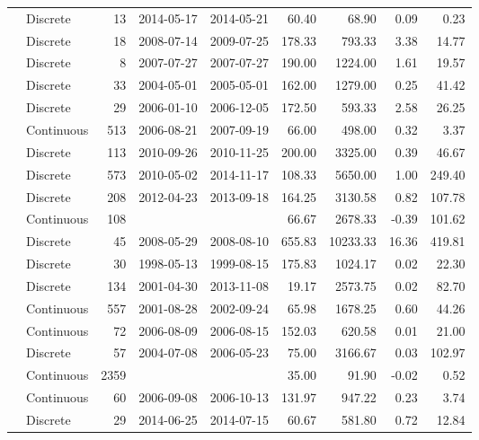 \begin{table}[ht]
\begin{tabular}{llrllrrrr}
  \citet{Gonnelli2016} & Discrete &  13 & 2014-05-17 & 2014-05-21 & 60.40 & 68.90 & 0.09 & 0.23 \\ 
  \citet{Griffin2011} & Discrete &  18 & 2008-07-14 & 2009-07-25 & 178.33 & 793.33 & 3.38 & 14.77 \\ 
  \citet{Gueguen2011} & Discrete &   8 & 2007-07-27 & 2007-07-27 & 190.00 & 1224.00 & 1.61 & 19.57 \\ 
  \citet{Helms2008} & Discrete &  33 & 2004-05-01 & 2005-05-01 & 162.00 & 1279.00 & 0.25 & 41.42 \\ 
  \citet{Hernes2008} & Discrete &  29 & 2006-01-10 & 2006-12-05 & 172.50 & 593.33 & 2.58 & 26.25 \\ 
  \citet{kattegat} & Continuous & 513 & 2006-08-21 & 2007-09-19 & 66.00 & 498.00 & 0.32 & 3.37 \\ 
  \citet{Kellerman2015} & Discrete & 113 & 2010-09-26 & 2010-11-25 & 200.00 & 3325.00 & 0.39 & 46.67 \\ 
  \citet{Lambert2015a} & Discrete & 573 & 2010-05-02 & 2014-11-17 & 108.33 & 5650.00 & 1.00 & 249.40 \\ 
  \citet{Loken2016} & Discrete & 208 & 2012-04-23 & 2013-09-18 & 164.25 & 3130.58 & 0.82 & 107.78 \\ 
  \citet{lter2004} & Continuous & 108 &  &  & 66.67 & 2678.33 & -0.39 & 101.62 \\ 
  \citet{lter2008} & Discrete &  45 & 2008-05-29 & 2008-08-10 & 655.83 & 10233.33 & 16.36 & 419.81 \\ 
  \citet{lter5653} & Discrete &  30 & 1998-05-13 & 1999-08-15 & 175.83 & 1024.17 & 0.02 & 22.30 \\ 
  \citet{lter5689} & Discrete & 134 & 2001-04-30 & 2013-11-08 & 19.17 & 2573.75 & 0.02 & 82.70 \\ 
  \citet{Markager2011} & Continuous & 557 & 2001-08-28 & 2002-09-24 & 65.98 & 1678.25 & 0.60 & 44.26 \\ 
  \citet{Massicotte2011EA} & Continuous &  72 & 2006-08-09 & 2006-08-15 & 152.03 & 620.58 & 0.01 & 21.00 \\ 
  \citet{Moran2006} & Discrete &  57 & 2004-07-08 & 2006-05-23 & 75.00 & 3166.67 & 0.03 & 102.97 \\ 
  \citet{Nelson2002, Nelson2007, Nelson2010} & Continuous & 2359 &  &  & 35.00 & 91.90 & -0.02 & 0.52 \\ 
  \citet{Norman2011} & Continuous &  60 & 2006-09-08 & 2006-10-13 & 131.97 & 947.22 & 0.23 & 3.74 \\ 
  \citet{Oestreich2016} & Discrete &  29 & 2014-06-25 & 2014-07-15 & 60.67 & 581.80 & 0.72 & 12.84 \\ 

\end{tabular}
\end{table}
